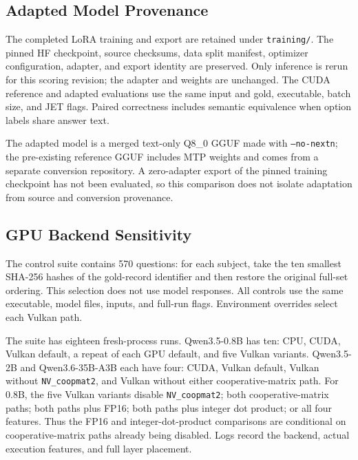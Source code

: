 \subsection{Adapted Model Provenance}
The completed LoRA training and export are retained under \texttt{training/}.
The pinned HF checkpoint, source checksums, data split manifest, optimizer
configuration, adapter, and export identity are preserved. Only inference is
rerun for this scoring revision; the adapter and weights are unchanged.
The CUDA reference and adapted evaluations use the same input and gold,
executable, batch size, and JET flags. Paired correctness includes semantic
equivalence when option labels share answer text.

The adapted model is a merged text-only Q8\_0 GGUF made with
\texttt{--no-nextn}; the pre-existing reference GGUF includes MTP weights and
comes from a separate conversion repository. A zero-adapter export of the
pinned training checkpoint has not been evaluated, so this comparison does
not isolate adaptation from source and conversion provenance.

\subsection{GPU Backend Sensitivity}
\label{sec:backend-sensitivity}
The control suite contains 570 questions: for each subject, take the ten
smallest SHA-256 hashes of the gold-record identifier and then restore the
original full-set ordering. This selection does not use model responses.
All controls use the same executable, model files, inputs, and full-run flags.
Environment overrides select each Vulkan path.

The suite has eighteen fresh-process runs. Qwen3.5-0.8B has ten: CPU, CUDA,
Vulkan default, a repeat of each GPU default, and five Vulkan variants.
Qwen3.5-2B and Qwen3.6-35B-A3B each have four: CUDA, Vulkan default,
Vulkan without \texttt{NV\_coopmat2}, and Vulkan without either cooperative-matrix
path. For 0.8B, the five Vulkan variants disable \texttt{NV\_coopmat2};
both cooperative-matrix paths; both paths plus FP16; both paths plus integer
dot product; or all four features. Thus the FP16 and integer-dot-product
comparisons are conditional on cooperative-matrix paths already being disabled.
Logs record the backend, actual execution features, and full layer placement.


